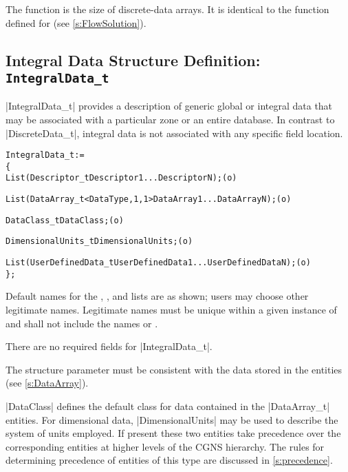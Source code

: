The function  is the size of discrete-data arrays.
It is identical to the function  defined for
 (see \autoref{s:FlowSolution}).

\subsection{Integral Data Structure Definition: \texttt{IntegralData\_t}} 
\label{s:IntegralData}

|IntegralData_t| provides a description of generic global or integral data
that may be associated with a particular zone or an entire database.
In contrast to |DiscreteData_t|, integral data is not associated with
any specific field location.
\begin{alltt}
  IntegralData\_t :=
    \{
    List( Descriptor\_t Descriptor1 ... DescriptorN ) ;                      (o)

    List( DataArray\_t<DataType, 1, 1> DataArray1 ... DataArrayN ) ;         (o)

    DataClass\_t DataClass ;                                                 (o)
    
    DimensionalUnits\_t DimensionalUnits ;                                   (o)

    List( UserDefinedData\_t UserDefinedData1 ... UserDefinedDataN ) ;       (o)
    \} ;
\end{alltt}

\begin{notes}
\item
 Default names for the , , and
 lists are as shown; users may choose other legitimate names.
 Legitimate names must be unique within a given instance of
  and shall not include the names 
 or .
\item
 There are no required fields for |IntegralData_t|.  
\item
 The structure parameter  must be consistent with the
 data stored in the  entities (see \autoref{s:DataArray}).
\end{notes}

|DataClass| defines the default class for data contained in the
|DataArray_t| entities.
For dimensional data, |DimensionalUnits| may be used to describe the
system of units employed.
If present these two entities take precedence over the corresponding
entities at higher levels of the CGNS hierarchy.
The rules for determining precedence of entities of this type are
discussed in \autoref{s:precedence}.

